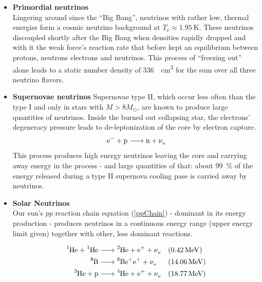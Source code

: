 	\begin{itemize}
	\item {\bf Primordial neutrinos}\\
		Lingering around since the ``Big Bang'', neutrinos with rather low, thermal energies form a cosmic neutrino background at $T_\nu\approx \SI{1.95}{\kelvin}$. These neutrinos discoupled shortly after the Big Bang when densities rapidly dropped and with it the weak force's reaction rate that before kept an equilibrium between protons, neutrons electrons and neutrinos. This process of ``freezing out'' alone leads to a static number density of \SI{336}{\per\cubic\centi\meter} for the sum over all three neutrino flavors.
	\item {\bf Supernovae neutrinos}
		Supernovae type II, which occur less often than the type I and only in stars with $M> 8M_\odot$, are known to produce large quantities of neutrinos. Inside the burned out collapsing star, the electrons' degeneracy pressure leads to de-leptonization of the core by electron capture.
		\begin{equation}
			\ce{e- + p -> n + \nu_e}
		\end{equation}
		This process produces high energy neutrinos leaving the core and carrying away energy in the process - and large quantities of that: about \SI{99}{\percent} of the energy released during a type II supernova cooling pase is carried away by neutrinos.

	\item {\bf Solar Neutrinos}\\
		Our sun's $pp$ reaction chain equation (\ref{ppChain}) - dominant in its energy production - produces neutrinos in a continuous energy range (upper energy limit given) together with other, less dominant reactions.

		\begin{align}
		\label{ppChain}
			\ce{^1He + ^1 He} & \ce{ -> ^2 He + e+ + \nu_e} && (\SI{0.42}{\mega\electronvolt})\\
			\ce{^8B } & \ce{-> ^8Be+ e+ + \nu_e} && (\SI{14.06}{\mega\electronvolt})\\
			\ce{^3He + p } & \ce{ -> ^4He + e+ + \nu_e} && (\SI{18.77}{\mega\electronvolt})
		\end{align}


\end{itemize}
